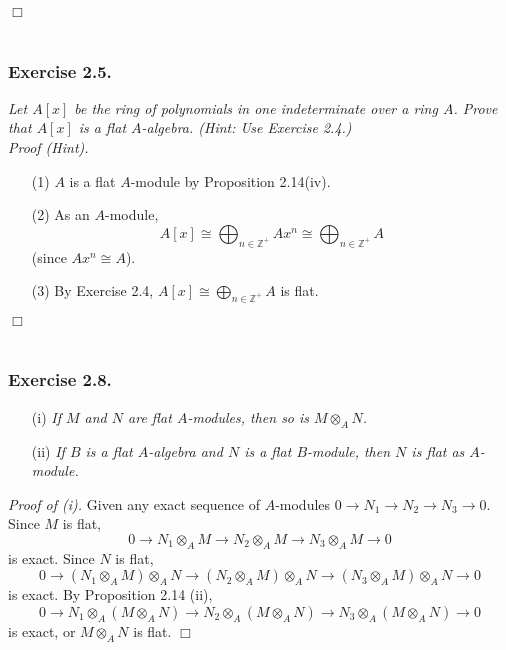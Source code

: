 \documentclass{article}
\begin{document}
$\Box$ \\\\






\subsubsection*{Exercise 2.5.}
\emph{Let $A[x]$ be the ring of polynomials in one indeterminate over a ring $A$.
Prove that $A[x]$ is a flat $A$-algebra. (Hint: Use Exercise 2.4.)} \\

\emph{Proof (Hint).}
\begin{enumerate}
\item[(1)]
$A$ is a flat $A$-module by Proposition 2.14(iv).
\item[(2)]
As an $A$-module,
$$A[x]
\cong \bigoplus_{n \in \mathbb{Z}^+} Ax^n
\cong \bigoplus_{n \in \mathbb{Z}^+} A$$
(since $Ax^n \cong A$).
\item[(3)]
By Exercise 2.4, $A[x] \cong \bigoplus_{n \in \mathbb{Z}^+} A$ is flat.
\end{enumerate}
$\Box$ \\\\






\subsubsection*{Exercise 2.8.}
\begin{enumerate}
\item[(i)]
  \emph{If $M$ and $N$ are flat $A$-modules, then so is $M \otimes_{A} N$. }

\item[(ii)]
  \emph{If $B$ is a flat $A$-algebra and $N$ is a flat $B$-module,
  then $N$ is flat as $A$-module.} \\
\end{enumerate}



\emph{Proof of (i).}
Given any exact sequence of $A$-modules
$0 \to N_1 \to N_2 \to N_3 \to 0$.
Since $M$ is flat,
\[
  0 \to N_1 \otimes_{A} M \to N_2 \otimes_{A} M \to N_3 \otimes_{A} M \to 0
\]
is exact.
Since $N$ is flat,
\[
  0 \to (N_1 \otimes_{A} M) \otimes_{A} N
  \to (N_2 \otimes_{A} M) \otimes_{A} N
  \to (N_3 \otimes_{A} M) \otimes_{A} N \to 0
\]
is exact.
By Proposition 2.14 (ii),
\[
  0 \to N_1 \otimes_{A} (M \otimes_{A} N)
  \to N_2 \otimes_{A} (M \otimes_{A} N)
  \to N_3 \otimes_{A} (M \otimes_{A} N) \to 0
\]
is exact, or $M \otimes_{A} N$ is flat.
$\Box$ \\
\end{document}
